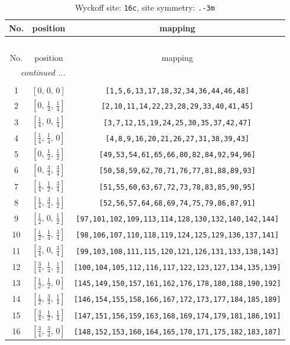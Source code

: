 \documentclass[fleqn,8pt]{jsarticle}
\begin{document}
\begin{longtable}{ccc}
\caption{Wyckoff site: {\tt 16c}, site symmetry: {\tt .-3m}}
 \\
 \hline \hline
No. & position & mapping \\ \hline \endfirsthead

\multicolumn{2}{l}{\tablename\ \thetable{}} \\
 \hline \hline
No. & position & mapping \\ \hline \endhead

 \hline \hline
\multicolumn{2}{r}{\footnotesize\it continued ...} \\ \endfoot

 \hline \hline
\multicolumn{2}{r}{} \\ \endlastfoot

1 & $\left[ 0,\, 0,\, 0 \right]$ & {\tt [1,5,6,13,17,18,32,34,36,44,46,48]} \\ \hline
2 & $\left[ 0,\, \frac{1}{4},\, \frac{1}{4} \right]$ & {\tt [2,10,11,14,22,23,28,29,33,40,41,45]} \\ \hline
3 & $\left[ \frac{1}{4},\, 0,\, \frac{1}{4} \right]$ & {\tt [3,7,12,15,19,24,25,30,35,37,42,47]} \\ \hline
4 & $\left[ \frac{1}{4},\, \frac{1}{4},\, 0 \right]$ & {\tt [4,8,9,16,20,21,26,27,31,38,39,43]} \\ \hline
5 & $\left[ 0,\, \frac{1}{2},\, \frac{1}{2} \right]$ & {\tt [49,53,54,61,65,66,80,82,84,92,94,96]} \\ \hline
6 & $\left[ 0,\, \frac{3}{4},\, \frac{3}{4} \right]$ & {\tt [50,58,59,62,70,71,76,77,81,88,89,93]} \\ \hline
7 & $\left[ \frac{1}{4},\, \frac{1}{2},\, \frac{3}{4} \right]$ & {\tt [51,55,60,63,67,72,73,78,83,85,90,95]} \\ \hline
8 & $\left[ \frac{1}{4},\, \frac{3}{4},\, \frac{1}{2} \right]$ & {\tt [52,56,57,64,68,69,74,75,79,86,87,91]} \\ \hline
9 & $\left[ \frac{1}{2},\, 0,\, \frac{1}{2} \right]$ & {\tt [97,101,102,109,113,114,128,130,132,140,142,144]} \\ \hline
10 & $\left[ \frac{1}{2},\, \frac{1}{4},\, \frac{3}{4} \right]$ & {\tt [98,106,107,110,118,119,124,125,129,136,137,141]} \\ \hline
11 & $\left[ \frac{3}{4},\, 0,\, \frac{3}{4} \right]$ & {\tt [99,103,108,111,115,120,121,126,131,133,138,143]} \\ \hline
12 & $\left[ \frac{3}{4},\, \frac{1}{4},\, \frac{1}{2} \right]$ & {\tt [100,104,105,112,116,117,122,123,127,134,135,139]} \\ \hline
13 & $\left[ \frac{1}{2},\, \frac{1}{2},\, 0 \right]$ & {\tt [145,149,150,157,161,162,176,178,180,188,190,192]} \\ \hline
14 & $\left[ \frac{1}{2},\, \frac{3}{4},\, \frac{1}{4} \right]$ & {\tt [146,154,155,158,166,167,172,173,177,184,185,189]} \\ \hline
15 & $\left[ \frac{3}{4},\, \frac{1}{2},\, \frac{1}{4} \right]$ & {\tt [147,151,156,159,163,168,169,174,179,181,186,191]} \\ \hline
16 & $\left[ \frac{3}{4},\, \frac{3}{4},\, 0 \right]$ & {\tt [148,152,153,160,164,165,170,171,175,182,183,187]} \\
\end{longtable}
\end{document}
